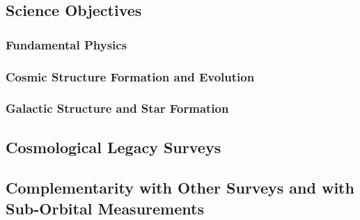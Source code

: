 \documentclass[12pt]{article}
\begin{document}

\subsection{Science Objectives} %





\subsubsection{Fundamental Physics} %
\label{sec:fundamentalsci}





\subsubsection{Cosmic Structure Formation and Evolution} %
\label{sec:extragalacticsci}



\subsubsection{Galactic Structure and Star Formation} %
\label{sec:galacticsci}



\subsection{Cosmological Legacy Surveys} %






\subsection{Complementarity with Other Surveys and with Sub-Orbital Measurements} %



\end{document}
